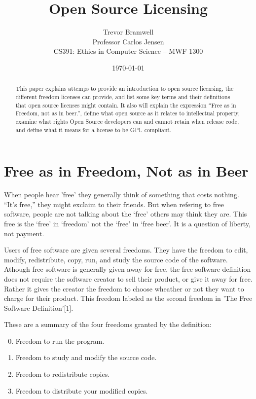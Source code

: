 \documentclass[12pt,letterpaper]{article}
\title{Open Source Licensing}
\author{
    Trevor Bramwell\\
    Professor Carlos Jensen\\
    CS391: Ethics in Computer Science -- MWF 1300\\
}
\date{\today}
\begin{document}
\maketitle

\begin{abstract}
This paper explains attemps to provide an introduction to open source
licensing, the different freedom licenses can provide, and list some key
terms and their definitions that open source licenses might contain.  It
also will explain the expression ``Free as in Freedom, not as in
beer.'', define what open source as it relates to intellectual property,
examine what rights Open Source developers can and cannot retain when
release code, and define what it means for a license to be GPL
compliant.
\end{abstract}


\section*{Free as in Freedom, Not as in Beer}
When people hear 'free' they generally think of something that costs
nothing. ``It's free,'' they might exclaim to their friends. But
when refering to free software, people are not talking about the `free'
others may think they are. This free is the `free' in `freedom' not
the `free' in `free beer'. It is a question of liberty, not payment.

Users of free software are given several freedoms. They have the freedom
to edit, modify, redistribute, copy, run, and study the source code of
the software. Athough free software is
generally given away for free, the free software definition does not
require the software creator to sell their product, or give it away for
free. Rather it gives the creator the freedom to choose wheather or not
they want to charge for their product. This freedom labeled as the
second freedom in 'The Free Software Definition'[1].

These are a summary of the four freedoms granted by the definition:
    \begin{enumerate}
    \setcounter{enumi}{-1}
        \item Freedom to run the program.
        \item Freedom to study and modify the source code.
        \item Freedom to redistribute copies.
        \item Freedom to distribute your modified copies.
    \end{enumerate}
\end{document}
